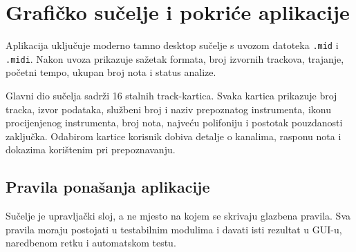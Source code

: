 \documentclass[11pt]{article}
\begin{document}
\section{Grafičko sučelje i pokriće aplikacije}

Aplikacija uključuje moderno tamno desktop sučelje s uvozom datoteka
\texttt{.mid} i \texttt{.midi}. Nakon uvoza prikazuje sažetak formata, broj
izvornih trackova, trajanje, početni tempo, ukupan broj nota i status analize.

Glavni dio sučelja sadrži 16 stalnih track-kartica. Svaka kartica prikazuje
broj tracka, izvor podataka, službeni broj i naziv prepoznatog instrumenta,
ikonu procijenjenog instrumenta, broj nota, najveću polifoniju i postotak
pouzdanosti zaključka. Odabirom kartice korisnik dobiva detalje o kanalima,
rasponu nota i dokazima korištenim pri prepoznavanju.

\subsection{Pravila ponašanja aplikacije}

Sučelje je upravljački sloj, a ne mjesto na kojem se skrivaju glazbena pravila.
Sva pravila moraju postojati u testabilnim modulima i davati isti rezultat u
GUI-u, naredbenom retku i automatskom testu.
\end{document}
